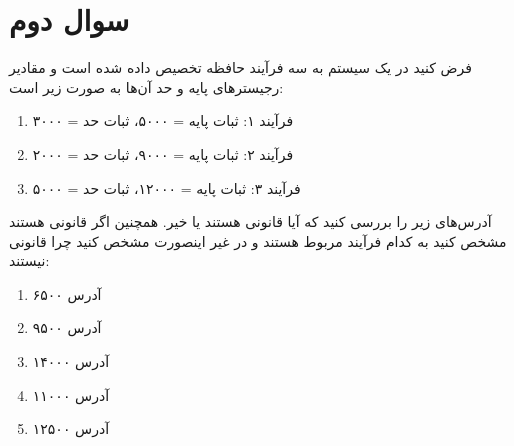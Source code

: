 \section{سوال دوم}


فرض کنید در یک سیستم به سه فرآیند حافظه تخصیص داده شده است و مقادیر رجیسترهای پایه و حد آن‌ها به صورت زیر است:

\begin{enumerate}
	\item فرآیند ۱: ثبات پایه = ۵۰۰۰، ثبات حد = ۳۰۰۰
	\item فرآیند ۲: ثبات پایه = ۹۰۰۰، ثبات حد = ۲۰۰۰
	\item فرآیند ۳: ثبات پایه = ۱۲۰۰۰، ثبات حد = ۵۰۰۰
\end{enumerate}

آدرس‌های زیر را بررسی کنید که آیا قانونی هستند یا خیر. همچنین اگر قانونی هستند مشخص کنید به کدام فرآیند مربوط هستند و در غیر اینصورت مشخص کنید چرا قانونی نیستند:

\begin{enumerate}
	\item آدرس ۶۵۰۰
	\item آدرس ۹۵۰۰
	\item آدرس ۱۴۰۰۰
	\item آدرس ۱۱۰۰۰
		\item آدرس ۱۲۵۰۰
\end{enumerate}


